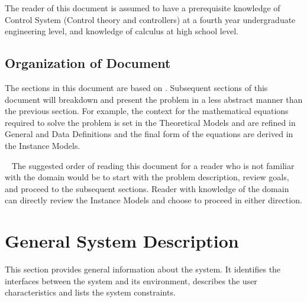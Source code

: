 \documentclass[12pt]{article}
\begin{document}
The reader of this document is assumed to have a prerequisite knowledge of 
Control System (Control theory and controllers) at a fourth year undergraduate 
engineering level, and knowledge of calculus at high school level. 

\subsection{Organization of Document}


The sections in this document are based on \citet{SmithAndLai2005, 
SmithEtAl2007}. Subsequent sections of this document will breakdown and present 
the problem in a less abstract manner than the previous section. 
For example, the context for the mathematical equations required to solve the 
problem is set in the Theoretical Models and are refined in General and Data 
Definitions and the final form of the equations are derived in the Instance 
Models. 

~\newline
The suggested order of reading this document for a reader who is not familiar 
with the domain would be to start with the problem description, review goals, 
and proceed to the subsequent sections. Reader with knowledge of the domain 
can directly review the Instance Models and choose to proceed in either direction.

\section{General System Description}

This section provides general information about the system. It identifies the
interfaces between the system and its environment, describes the user
characteristics and lists the system constraints.  

\end{document}

